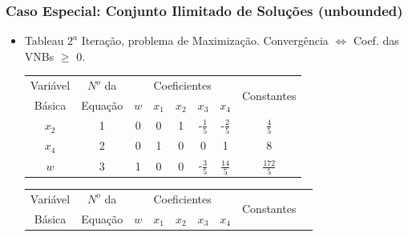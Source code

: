\documentclass{beamer}
\begin{document}
\begin{frame}
	\frametitle{Caso Especial: Conjunto Ilimitado de Soluções (unbounded)}

	\begin{itemize}
		\item {Tableau $2^a$ Iteração, problema de Maximização. Convergência $\Leftrightarrow$ Coef. das VNBs $\ge$ 0.}
			\only<1>
			{
			\begin{table}
				\scriptsize
				\newcommand{\azbr}{\cellcolor{blue!70} \color{white}}
				\newcommand{\azvm}{\cellcolor{blue!70} \color{red}}
				\newcommand{\ampr}{\cellcolor{yellow!70} \color{black}}
				\newcommand{\amvm}{\cellcolor{yellow!70} \color{red}}
				\begin{tabular}{ c  c  c  c  c  c  c  c }
				\azbr Variável & \azbr $N^o$ da & \multicolumn{5}{c}{\azbr Coeficientes} & \multirow{2}{1.5cm}{\azbr  Constantes} \\[3pt]
				\azbr Básica   & \azbr Equação  & \azbr $w$ & \azbr  $x_1$ & \azvm $x_2$ & \azbr $x_3$           & \azvm $x_4$          & \azbr      		  \\[3pt]
				\amvm $x_2$    & \ampr 1        & \ampr 0   & \ampr 0      & \ampr 1     & \ampr -$\frac{1}{5}$  & \ampr -$\frac{2}{5}$ & \ampr $\frac{4}{5}$ \\[3pt]
				\amvm $x_4$    & \ampr 2        & \ampr 0   & \ampr 1      & \ampr 0     & \ampr 0               & \ampr 1              & \ampr 8  			  \\[3pt]
				\ampr $w$      & \ampr 3        & \ampr 1   & \ampr 0      & \ampr 0     & \ampr -$\frac{3}{5}$  & \ampr $\frac{14}{5}$ & \ampr $\frac{172}{5}$\\[3pt]
				\end{tabular}
			\end{table}
			}
			{
			\begin{table}
				\scriptsize
				\newcommand{\azbr}{\cellcolor{blue!70} \color{white}}
				\newcommand{\azvm}{\cellcolor{blue!70} \color{red}}
				\newcommand{\ampr}{\cellcolor{yellow!70} \color{black}}
				\newcommand{\amvm}{\cellcolor{yellow!70} \color{red}}
				\newcommand{\prpr}{\cellcolor{black!40} \color{black}}
				\begin{tabular}{ c  c  c  c  c  c  c  c c }
				\azbr Variável & \azbr $N^o$ da & \multicolumn{5}{c}{\azbr Coeficientes} & \multirow{2}{1.5cm}{\azbr  Constantes} \\[3pt]
				\azbr Básica   & \azbr Equação  & \azbr $w$ & \azbr  $x_1$ & \azvm $x_2$ & \azbr $x_3$           & \azvm $x_4$          & \azbr      		     \\[3pt]

\end{tabular}
\end{table}}
\end{itemize}
\end{frame}
\end{document}
